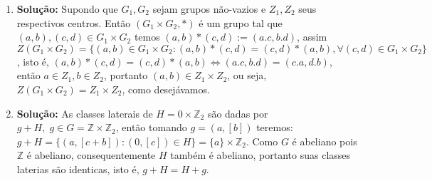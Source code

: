 \documentclass{article}
\begin{document}
\begin{enumerate}
		\item \textbf{Solução:} Supondo que $G_{1}, G_{2}$ sejam grupos não-vazios e $Z_{1}, Z_{2}$ seus respectivos centros. Então $(G_{1}\times G_{2}, *)$ é um grupo tal que $(a, b), (c, d) \in G_{1}\times G_{2}$ temos $(a,b)*(c,d) := (a.c, b.d)$, assim $Z(G_{1}\times G_{2}) = \{(a, b) \in G_{1}\times G_{2}: (a, b)*(c, d) = (c, d)*(a, b), \forall (c, d) \in G_{1}\times G_{2}\}$, isto é, $(a, b)*(c,d)=(c,d)*(a, b) \iff (a.c, b.d) =(c.a, d.b)$, então $a \in Z_{1}, b \in Z_{2}$, portanto $(a,b) \in Z_{1} \times Z_{2}$, ou seja, $Z(G_{1}\times G_{2}) = Z_{1} \times Z_{2}$, como desejávamos.
		
		\item \textbf{Solução:} As classes laterais de $H = 0 \times \mathbb{Z}_{2}$ são dadas por $g+H, \; g\in G =\mathbb{Z} \times \mathbb{Z}_{2}$, então tomando $g=(a, [b])$ teremos: $g+H = \{(a,[c+b]): (0,[c]) \in H\} = \{a\} \times \mathbb{Z}_{2}$. Como $G$ é abeliano pois $\mathbb{Z}$ é abeliano, consequentemente $H$ também é abeliano, portanto suas classes laterias são identicas, isto é, $g+H = H+g$.  
		

\end{enumerate}
\end{document}
